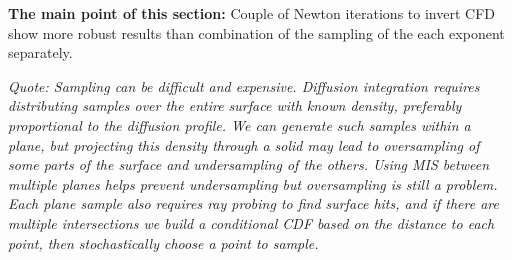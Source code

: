 \textbf{The main point of this section:}
Couple of Newton iterations to invert CFD show more robust results than
combination of the sampling of the each exponent separately.

\emph{Quote: Sampling can be difficult and expensive. Diffusion
integration requires distributing samples over the entire surface with known
density, preferably proportional to the diffusion profile. We can generate
such samples within a plane, but projecting this density through a solid may
lead to oversampling of some parts of the surface and undersampling of the
others.
Using MIS between multiple planes \cite{King:2013:BIS:2504459.2504520}  helps prevent
undersampling but oversampling is still a problem. Each plane sample also
requires ray probing to find surface hits, and if there are multiple
intersections we build a conditional CDF based on the distance to each point,
then stochastically choose a point to sample.}